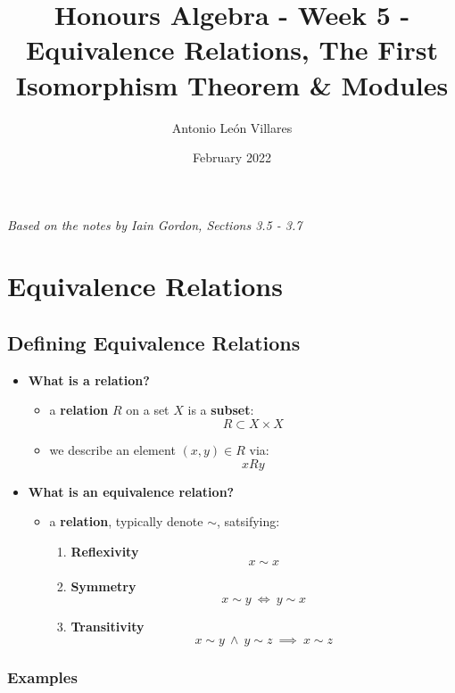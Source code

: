 \documentclass{exam}
\title{Honours Algebra - Week 5 - Equivalence Relations, The First Isomorphism Theorem \& Modules}
\author{Antonio León Villares}
\date{February 2022}
\begin{document}
\maketitle

\tableofcontents

\pagebreak

\textit{Based on the notes by Iain Gordon, Sections 3.5 - 3.7}

\section{Equivalence Relations}

\subsection{Defining Equivalence Relations}

\begin{itemize}
    \item \textbf{What is a relation?}
    \begin{itemize}
        \item a \textbf{relation} $R$ on a set $X$ is a \textbf{subset}:
        \[
        R \subset X \times X
        \]
        \item we describe an element $(x,y) \in R$ via:
        \[
        xRy
        \]
    \end{itemize}
    \item \textbf{What is an equivalence relation?}
    \begin{itemize}
        \item a \textbf{relation}, typically denote $\sim$, satsifying:
        \begin{enumerate}
            \item \textbf{Reflexivity}
            \[
            x \sim x
            \]
            \item \textbf{Symmetry}
            \[
            x \sim y \ \iff \ y \sim x
            \]
            \item \textbf{Transitivity}
            \[
            x \sim y \ \wedge \ y \sim z \ \implies \ x \sim z
            \]
        \end{enumerate}
    \end{itemize}
\end{itemize}

\subsubsection{Examples}
\end{document}
